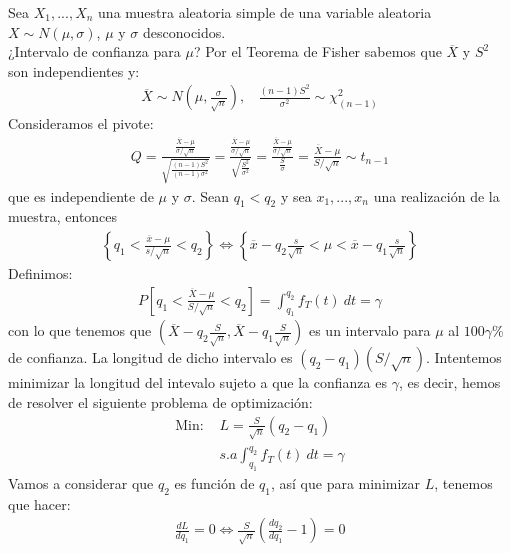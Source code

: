 \begin{ejemplo}
Sea $X_1,...,X_n$ una muestra aleatoria simple de una variable aleatoria $X \sim N(\mu,\sigma)$, $\mu$ y $\sigma$ desconocidos.
\\
\newline
¿Intervalo de confianza para $\mu$? Por el Teorema de Fisher sabemos que $\overline{X}$ y $S^2$ son independientes y:
\begin{align*}
    \overline{X} \sim N\left( \mu, \frac{\sigma}{\sqrt{n}} \right), \ \ \ \ \frac{(n-1)S^2}{\sigma^2} \sim \chi^2_{(n-1)}
\end{align*}
Consideramos el pivote:
\begin{align*}
    Q = \frac{\frac{\overline{X} -\mu}{\sigma/\sqrt{n}}}{\sqrt{\frac{(n-1)S^2}{(n-1)\sigma^2}}} = \frac{\frac{\overline{X} -\mu}{\sigma/\sqrt{n}}}{\sqrt{\frac{S^2}{\sigma^2}}} = \frac{\frac{\overline{X} -\mu}{\sigma/\sqrt{n}}}{{\frac{S}{\sigma}}} = \frac{\overline{X} - \mu}{S/\sqrt{n}} \sim t_{n-1}
\end{align*}
que es independiente de $\mu$ y $\sigma$. Sean $q_1 < q_2$ y sea $x_1,...,x_n$ una realización de la muestra, entonces
\begin{align*}
    \left\{ q_1 < \frac{\overline{x} -\mu}{s/\sqrt{n}} < q_2 \right\} \Longleftrightarrow \left\{ \overline{x} - q_2 \frac{s}{\sqrt{n}} < \mu < \overline{x} -q_1\frac{s}{\sqrt{n}}\right\}
\end{align*}
Definimos:
\begin{align*}
    P\left[  q_1 < \frac{\overline{X} -\mu}{S/\sqrt{n}} < q_2 \right] = \int_{q_1}^{q_2}{f_T(t) \ dt} = \gamma 
\end{align*}
con lo que tenemos que $\left(\overline{X} - q_2 \frac{S}{\sqrt{n}} , \overline{X} -q_1\frac{S}{\sqrt{n}}\right)$ es un intervalo para $\mu$ al $100\gamma \%$ de confianza. La longitud de dicho intervalo es $(q_2 - q_1)(S/\sqrt{n})$. Intentemos minimizar la longitud del intevalo sujeto a que la confianza es $\gamma$, es decir, hemos de resolver el siguiente problema de optimización:
\begin{align*}
    \text{Min: }  &L = \frac{S}{\sqrt{n}}(q_2 - q_1) \\
    & s.a \int_{q_1}^{q_2}{f_T(t) \ dt} = \gamma
\end{align*}
Vamos a considerar que $q_2$ es función de $q_1$, así que para minimizar $L$, tenemos que hacer:
\begin{align*}
    \frac{d L}{d q_1} = 0 \Longleftrightarrow \frac{S}{\sqrt{n}}\left( \frac{d q_2}{d q_1} -1 \right) = 0
\end{align*}

\end{ejemplo}
